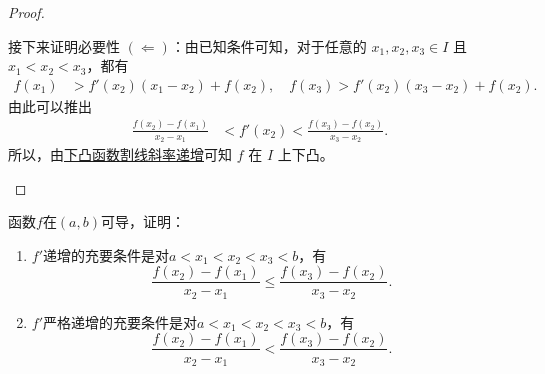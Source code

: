 \documentclass[lang=cn,newtx,10pt,scheme=chinese]{elegantbook}
\begin{document}
\begin{proof}
\begin{enumerate}
\begin{enumerate}[(1)]
接下来证明必要性 $(\Leftarrow)$：由已知条件可知，对于任意的 $x_1,x_2,x_3\in I$ 且 $x_1 < x_2 < x_3$，都有
\begin{align*}
f(x_1) &> f'(x_2)(x_1 - x_2) + f(x_2),\quad f(x_3) > f'(x_2)(x_3 - x_2) + f(x_2).
\end{align*}
由此可以推出
\begin{align*}
\frac{f(x_2) - f(x_1)}{x_2 - x_1} &< f'(x_2) < \frac{f(x_3) - f(x_2)}{x_3 - x_2}.
\end{align*}
所以，由\hyperref[下凸函数割线斜率递增]{下凸函数割线斜率递增}可知 $f$ 在 $I$ 上下凸。
\end{enumerate}
\end{enumerate}
\end{proof}

\begin{example}[$\,\,$导数递增则割线斜率也递增]\label{example:导数递增则割线斜率也递增}
函数\(f\)在\((a,b)\)可导，证明：
\begin{enumerate}
\item \(f'\)递增的充要条件是对\(a < x_1 < x_2 < x_3 < b\)，有
\[
\frac{f(x_2)-f(x_1)}{x_2 - x_1}\leqslant\frac{f(x_3)-f(x_2)}{x_3 - x_2}.
\]

\item \(f'\)严格递增的充要条件是对\(a < x_1 < x_2 < x_3 < b\)，有
\[
\frac{f(x_2)-f(x_1)}{x_2 - x_1}<\frac{f(x_3)-f(x_2)}{x_3 - x_2}.
\]
\end{enumerate}
\end{example}
\end{document}
